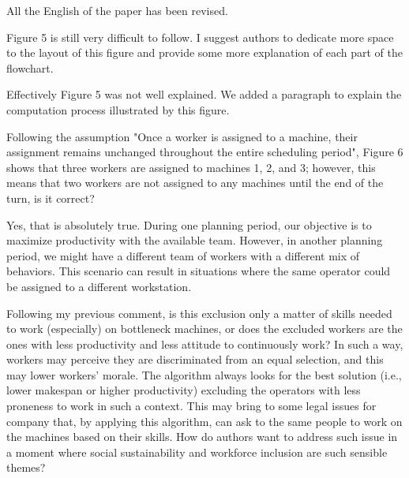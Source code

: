 \documentclass[preprint,11pt,3p]{elsarticle}
\begin{document}
\begin{tcolorbox}[colback=r_color1,colframe=r_color2,title=R7:]
All the English of the paper has been revised.
\end{tcolorbox}
\begin{tcolorbox}[colback=q_color1,colframe=q_color2,title=Q8  :] Figure 5 is still very difficult to follow. I suggest authors to dedicate more space to the layout of this figure and provide some more explanation of each part of the flowchart.
\end{tcolorbox}

\begin{tcolorbox}[colback=r_color1,colframe=r_color2,title=R8:]
Effectively Figure 5 was not well explained. We added a paragraph to explain the computation process illustrated by this figure. 
\end{tcolorbox}
\begin{tcolorbox}[colback=q_color1,colframe=q_color2,title=Q9:] Following the assumption "Once a worker is assigned to a machine, their assignment remains unchanged throughout the entire scheduling period", Figure 6 shows that three workers are assigned to machines 1, 2, and 3; however, this means that two workers are not assigned to any machines until the end of the turn, is it correct?
\end{tcolorbox}

\begin{tcolorbox}[colback=r_color1,colframe=r_color2,title=R9:]
Yes, that is absolutely true. During one planning period, our objective is to maximize productivity with the available team. However, in another planning period, we might have a different team of workers with a different mix of behaviors. This scenario can result in situations where the same operator could be assigned to a different workstation.

\end{tcolorbox}

\begin{tcolorbox}[colback=q_color1,colframe=q_color2,title=Q10:] 
Following my previous comment, is this exclusion only a matter of skills needed to work (especially) on bottleneck machines, or does the excluded workers are the ones with less productivity and less attitude to continuously work? In such a way, workers may perceive they are discriminated from an equal selection, and this may lower workers' morale. The algorithm always looks for the best solution (i.e., lower makespan or higher productivity) excluding the operators with less proneness to work in such a context. This may bring to some legal issues for company that, by applying this algorithm, can ask to the same people to work on the machines based on their skills. How do authors want to address such issue in a moment where social sustainability and workforce inclusion are such sensible themes?
\end{tcolorbox}
\end{document}
